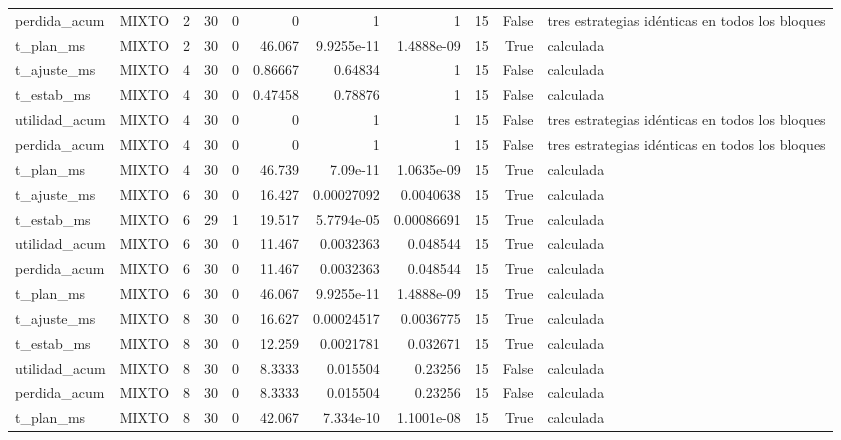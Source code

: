 \begin{tabular}{llrrrrrrrrl}
perdida_acum & MIXTO & 2 & 30 & 0 & 0 & 1 & 1 & 15 & False & tres estrategias idénticas en todos los bloques \\
t_plan_ms & MIXTO & 2 & 30 & 0 & 46.067 & 9.9255e-11 & 1.4888e-09 & 15 & True & calculada \\
t_ajuste_ms & MIXTO & 4 & 30 & 0 & 0.86667 & 0.64834 & 1 & 15 & False & calculada \\
t_estab_ms & MIXTO & 4 & 30 & 0 & 0.47458 & 0.78876 & 1 & 15 & False & calculada \\
utilidad_acum & MIXTO & 4 & 30 & 0 & 0 & 1 & 1 & 15 & False & tres estrategias idénticas en todos los bloques \\
perdida_acum & MIXTO & 4 & 30 & 0 & 0 & 1 & 1 & 15 & False & tres estrategias idénticas en todos los bloques \\
t_plan_ms & MIXTO & 4 & 30 & 0 & 46.739 & 7.09e-11 & 1.0635e-09 & 15 & True & calculada \\
t_ajuste_ms & MIXTO & 6 & 30 & 0 & 16.427 & 0.00027092 & 0.0040638 & 15 & True & calculada \\
t_estab_ms & MIXTO & 6 & 29 & 1 & 19.517 & 5.7794e-05 & 0.00086691 & 15 & True & calculada \\
utilidad_acum & MIXTO & 6 & 30 & 0 & 11.467 & 0.0032363 & 0.048544 & 15 & True & calculada \\
perdida_acum & MIXTO & 6 & 30 & 0 & 11.467 & 0.0032363 & 0.048544 & 15 & True & calculada \\
t_plan_ms & MIXTO & 6 & 30 & 0 & 46.067 & 9.9255e-11 & 1.4888e-09 & 15 & True & calculada \\
t_ajuste_ms & MIXTO & 8 & 30 & 0 & 16.627 & 0.00024517 & 0.0036775 & 15 & True & calculada \\
t_estab_ms & MIXTO & 8 & 30 & 0 & 12.259 & 0.0021781 & 0.032671 & 15 & True & calculada \\
utilidad_acum & MIXTO & 8 & 30 & 0 & 8.3333 & 0.015504 & 0.23256 & 15 & False & calculada \\
perdida_acum & MIXTO & 8 & 30 & 0 & 8.3333 & 0.015504 & 0.23256 & 15 & False & calculada \\
t_plan_ms & MIXTO & 8 & 30 & 0 & 42.067 & 7.334e-10 & 1.1001e-08 & 15 & True & calculada \\
\bottomrule
\end{tabular}
